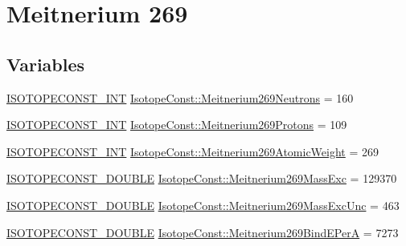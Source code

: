 \hypertarget{group___isotope_const-_meitnerium-_mt269}{}\section{Meitnerium 269}
\label{group___isotope_const-_meitnerium-_mt269}
\subsection*{Variables}
\begin{DoxyCompactItemize}
\item 
\mbox{\hyperlink{group___isotope_const-_macros_ga5f18360b3e99483a35c32d789e62621c}{I\+S\+O\+T\+O\+P\+E\+C\+O\+N\+S\+T\+\_\+\+I\+NT}} \mbox{\hyperlink{group___isotope_const-_meitnerium-_mt269_gaaaff493d477b27a1e3421ed872f187ac}{Isotope\+Const\+::\+Meitnerium269\+Neutrons}} = 160
\item 
\mbox{\hyperlink{group___isotope_const-_macros_ga5f18360b3e99483a35c32d789e62621c}{I\+S\+O\+T\+O\+P\+E\+C\+O\+N\+S\+T\+\_\+\+I\+NT}} \mbox{\hyperlink{group___isotope_const-_meitnerium-_mt269_ga72f389b2665c8d1eda98ed57eb62b374}{Isotope\+Const\+::\+Meitnerium269\+Protons}} = 109
\item 
\mbox{\hyperlink{group___isotope_const-_macros_ga5f18360b3e99483a35c32d789e62621c}{I\+S\+O\+T\+O\+P\+E\+C\+O\+N\+S\+T\+\_\+\+I\+NT}} \mbox{\hyperlink{group___isotope_const-_meitnerium-_mt269_ga9e66e0ef571ccc752f2c80226579a773}{Isotope\+Const\+::\+Meitnerium269\+Atomic\+Weight}} = 269
\item 
\mbox{\hyperlink{group___isotope_const-_macros_ga8f45a7272ce02c0b4c65c44636ed719a}{I\+S\+O\+T\+O\+P\+E\+C\+O\+N\+S\+T\+\_\+\+D\+O\+U\+B\+LE}} \mbox{\hyperlink{group___isotope_const-_meitnerium-_mt269_ga18ef91ebcac62baa5ece4bbbc952d447}{Isotope\+Const\+::\+Meitnerium269\+Mass\+Exc}} = 129370
\item 
\mbox{\hyperlink{group___isotope_const-_macros_ga8f45a7272ce02c0b4c65c44636ed719a}{I\+S\+O\+T\+O\+P\+E\+C\+O\+N\+S\+T\+\_\+\+D\+O\+U\+B\+LE}} \mbox{\hyperlink{group___isotope_const-_meitnerium-_mt269_ga03368d51ff0e5a684421efffaaed43e2}{Isotope\+Const\+::\+Meitnerium269\+Mass\+Exc\+Unc}} = 463
\item 
\mbox{\hyperlink{group___isotope_const-_macros_ga8f45a7272ce02c0b4c65c44636ed719a}{I\+S\+O\+T\+O\+P\+E\+C\+O\+N\+S\+T\+\_\+\+D\+O\+U\+B\+LE}} \mbox{\hyperlink{group___isotope_const-_meitnerium-_mt269_ga32ba6867ea85fe26e55949d0da4a5504}{Isotope\+Const\+::\+Meitnerium269\+Bind\+E\+PerA}} = 7273
\item 

\end{DoxyCompactItemize}

